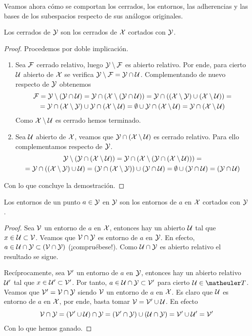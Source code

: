Veamos ahora cómo se comportan los cerrados, los entornos, las adherencias y las bases de los subespacios respecto de sus análogos originales.
\begin{lem}
	Los cerrados de $\mathcal{Y}$ son los cerrados de $\mathcal{X}$ cortados con $\mathcal{Y}$.
	
	\begin{proof} Procedemos por doble implicación.
		\begin{enumerate}
			\item[\bra] Sea $\mathcal{F}$ cerrado relativo, luego $\mathcal{Y}\setminus \mathcal{F}$ es abierto relativo. Por ende, para cierto $\mathcal{U}$ abierto de $\mathcal{X}$ se verifica $\mathcal{Y}\setminus \mathcal{F}=\mathcal{Y}\cap\mathcal{U}$. Complementando de nuevo respecto de $\mathcal{Y}$ obtenemos
			\begin{multline*}
				\mathcal{F} = \mathcal{Y}\setminus(\mathcal{Y}\cap\mathcal{U})=\mathcal{Y}\cap(\mathcal{X}\setminus(\mathcal{Y}\cap\mathcal{U}))=\mathcal{Y}\cap((\mathcal{X}\setminus\mathcal{Y})\cup(\mathcal{X}\setminus\mathcal{U}))=\\
				=\mathcal{Y}\cap(\mathcal{X}\setminus\mathcal{Y})\cup\mathcal{Y}\cap(\mathcal{X}\setminus\mathcal{U})=\emptyset\cup\mathcal{Y}\cap(\mathcal{X}\setminus\mathcal{U})=\mathcal{Y}\cap(\mathcal{X}\setminus\mathcal{U})
			\end{multline*}
			Como $\mathcal{X}\setminus\mathcal{U}$ es cerrado hemos terminado.
			\item[\bla] Sea $\mathcal{U}$ abierto de $\mathcal{X}$, veamos que $\mathcal{Y}\cap(\mathcal{X} \setminus\mathcal{U})$ es cerrado relativo. Para ello complementamos respecto de $\mathcal{Y}$.
			\begin{multline*}
				\mathcal{Y}\setminus(\mathcal{Y}\cap(\mathcal{X} \setminus\mathcal{U}))=\mathcal{Y}\cap(\mathcal{X} \setminus (\mathcal{Y}\cap(\mathcal{X} \setminus \mathcal{U})))=\\
				=\mathcal{Y}\cap((\mathcal{X}\setminus\mathcal{Y})\cup\mathcal{U})=(\mathcal{Y}\cap(\mathcal{X}\setminus\mathcal{Y}))\cup(\mathcal{Y}\cap\mathcal{U})=\emptyset\cup(\mathcal{Y}\cap\mathcal{U})=(\mathcal{Y}\cap\mathcal{U})
			\end{multline*}
		\end{enumerate}
		Con lo que concluye la demostración.
	\end{proof}
\end{lem}
\begin{lem}
	Los entornos de un punto $a \in \mathcal{Y}$ en $\mathcal{Y}$ son los entornos de $a$ en $\mathcal{X}$ cortados con $\mathcal{Y}$.	
\end{lem}
\begin{proof}
	Sea $\mathcal{V}$ un entorno de $a$ en $\mathcal{X}$, entonces hay un abierto $\mathcal{U}$ tal que $x \in \mathcal{U} \subset \mathcal{V}$. Veamos que $\mathcal{V} \cap \mathcal{Y}$ es entorno de $a$ en $\mathcal{Y}$. En efecto, $a \in \mathcal{U} \cap \mathcal{Y}\subset (\mathcal{V} \cap \mathcal{Y})$ (¡compruébese!). Como $\mathcal{U}\cap\mathcal{Y}$ es abierto relativo el resultado se sigue.
	
	Recíprocamente, sea $\mathcal{V}'$ un entorno de $a$ en $\mathcal{Y}$, entonces hay un abierto relativo $\mathcal{U}'$ tal que $x \in \mathcal{U}' \subset \mathcal{V}'$. Por tanto, $a \in \mathcal{U} \cap \mathcal{Y} \subset \mathcal{V}'$ para cierto $\U\in\T$. Veamos que $\mathcal{V}' = \mathcal{V} \cap \mathcal{Y}$ siendo $\mathcal{V}$ un entorno de $a$ en $\mathcal{X}$. Es claro que $\mathcal{U}$ es entorno de $a$ en $\mathcal{X}$, por ende, basta tomar $\mathcal{V} = \mathcal{V}' \cup \mathcal{U}$. En efecto
	\begin{equation*}
		\mathcal{V}\cap\mathcal{Y}=(\mathcal{V}'\cup\mathcal{U})\cap\mathcal{Y}=(\mathcal{V}'\cap\mathcal{Y})\cup(\mathcal{U}\cap\mathcal{Y})=\mathcal{V}'\cup\mathcal{U}'=\mathcal{V}'
	\end{equation*}
	Con lo que hemos ganado.
\end{proof}
